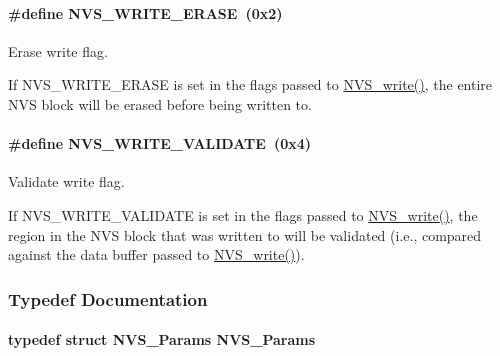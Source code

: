 \paragraph[{N\+V\+S\+\_\+\+W\+R\+I\+T\+E\+\_\+\+E\+R\+A\+S\+E}]{\setlength{\rightskip}{0pt plus 5cm}\#define N\+V\+S\+\_\+\+W\+R\+I\+T\+E\+\_\+\+E\+R\+A\+S\+E~(0x2)}\label{_n_v_s_8h_afdf449ac94235c5c4b108f5e5e925f03}


Erase write flag. 

If N\+V\+S\+\_\+\+W\+R\+I\+T\+E\+\_\+\+E\+R\+A\+S\+E is set in the flags passed to \hyperlink{_n_v_s_8h_a2c0acbdec0a65dc725019adb65ad282a}{N\+V\+S\+\_\+write()}, the entire N\+V\+S block will be erased before being written to. 
\paragraph[{N\+V\+S\+\_\+\+W\+R\+I\+T\+E\+\_\+\+V\+A\+L\+I\+D\+A\+T\+E}]{\setlength{\rightskip}{0pt plus 5cm}\#define N\+V\+S\+\_\+\+W\+R\+I\+T\+E\+\_\+\+V\+A\+L\+I\+D\+A\+T\+E~(0x4)}\label{_n_v_s_8h_a7c3340627bf9957b1ea3c1e1e2e0eddc}


Validate write flag. 

If N\+V\+S\+\_\+\+W\+R\+I\+T\+E\+\_\+\+V\+A\+L\+I\+D\+A\+T\+E is set in the flags passed to \hyperlink{_n_v_s_8h_a2c0acbdec0a65dc725019adb65ad282a}{N\+V\+S\+\_\+write()}, the region in the N\+V\+S block that was written to will be validated (i.\+e., compared against the data buffer passed to \hyperlink{_n_v_s_8h_a2c0acbdec0a65dc725019adb65ad282a}{N\+V\+S\+\_\+write()}). 

\subsubsection{Typedef Documentation}
\paragraph[{N\+V\+S\+\_\+\+Params}]{\setlength{\rightskip}{0pt plus 5cm}typedef struct {\bf N\+V\+S\+\_\+\+Params}  {\bf N\+V\+S\+\_\+\+Params}}\label{_n_v_s_8h_a00d64340188bed30cc27be46cf8a5aa4}


